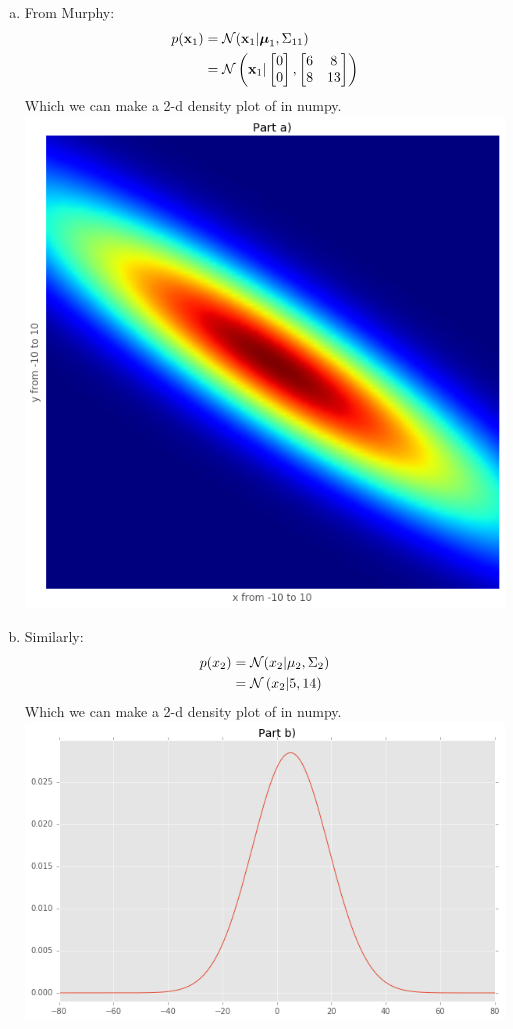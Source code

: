 \documentclass[12pt,letterpaper,fleqn]{hmcpset}
\begin{document}
\begin{solution}
    \begin{enumerate}[(a)]
        \item
            From Murphy: 
            \begin{align*}
                 p({\bf x}_1) &= {\cal N}({\bf x}_1|\hbox{\boldmath$\mu$}_1, \Sigma_{11}) \\
                 &= {\cal N} \left({\bf x}_1|\begin{bmatrix} 0\\0 \end{bmatrix}, \begin{bmatrix} 6 & 8\\ 8 & 13 \end{bmatrix} \right)
             \end{align*} 
             Which we can make a 2-d density plot of in numpy.\\
             \includegraphics[scale = .5]{p1a.png}
        \item
            Similarly: 
            \begin{align*}
                p(x_2) &= {\cal N}(x_2|\mu_2, \Sigma_2) \\
                 &= {\cal N} \left(x_2|5, 14 \right)
            \end{align*}
            Which we can make a 2-d density plot of in numpy.\\
            \includegraphics[scale = .5]{p1b.png}

\end{enumerate}
\end{solution}
\end{document}
